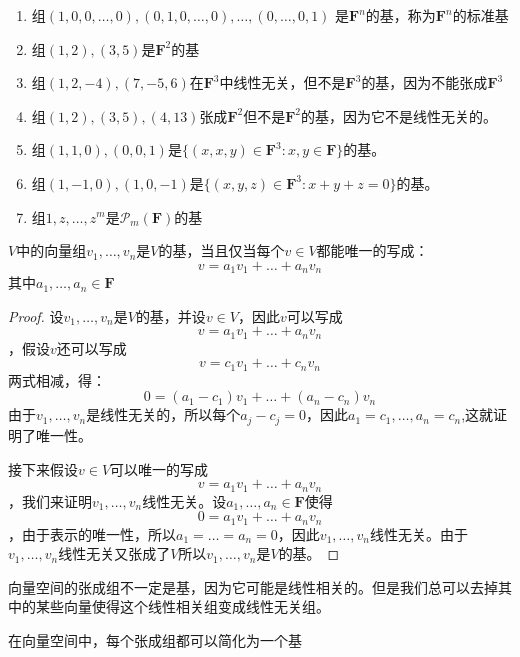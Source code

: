 \documentclass[10pt,a4paper,UTF8]{article}
\begin{document}
\begin{instance}
\begin{enumerate}
\item 组\((1,0,0,\ldots ,0),(0,1,0,\ldots ,0),\ldots ,(0,\ldots ,0,1)\) 是\(\mathbf{F}^{n}\)的基，称为\(\mathbf{F}^{n}\)的标准基
\item 组\((1,2),(3,5)\)是\(\mathbf{F}^{2}\)的基
\item 组\((1,2,-4),(7,-5,6)\)在\(\mathbf{F}^{3}\)中线性无关，但不是\(\mathbf{F}^{3}\)的基，因为不能张成\(\mathbf{F}^{3}\)
\item 组\((1,2),(3,5),(4,13)\)张成\(\mathbf{F}^{2}\)但不是\(\mathbf{F}^{2}\)的基，因为它不是线性无关的。
\item 组\((1,1,0),(0,0,1)\)是\(\{(x,x,y)\in \mathbf{F}^{3}:x,y\in \mathbf{F}\}\)的基。
\item 组\((1,-1,0),(1,0,-1)\)是\(\{(x,y,z)\in \mathbf{F}^{3}:x + y + z = 0\}\)的基。
\item 组\(1,z,\ldots ,z^{m}\)是\(\mathcal{P}_{m}(\mathbf{F})\)的基
\end{enumerate}
\end{instance}

\begin{theorem}[基的判定准则]
\(V\)中的向量组\(v_{1},\ldots ,v_{n}\)是\(V\)的基，当且仅当每个\(v\in V\)都能唯一的写成：\[v  = a_{1}v_{1} + \ldots + a_{n}v_{n}\]其中\(a_{1},\ldots ,a_{n}\in \mathbf{F}\)
\end{theorem}
\begin{proof}
设\(v_{1},\ldots ,v_{n}\)是\(V\)的基，并设\(v\in V\)，因此\(v\)可以写成\[v  = a_{1}v_{1} + \ldots + a_{n}v_{n}\]，假设\(v\)还可以写成\[v  = c_{1}v_{1} + \ldots + c_{n}v_{n}\]两式相减，得：
\[0  = (a_{1}- c_{1})v_{1} + \ldots + (a_{n}-c_{n})v_{n}\]由于\(v_{1},\ldots ,v_{n}\)是线性无关的，所以每个\(a_{j} - c_{j}=0\)，因此\(a_{1} = c_{1},\ldots ,a_{n} = c_{n}\),这就证明了唯一性。

接下来假设\(v\in V\)可以唯一的写成\[v  = a_{1}v_{1} + \ldots + a_{n}v_{n}\] ，我们来证明\(v_{1},\ldots ,v_{n}\)线性无关。设\(a_{1},\ldots ,a_{n}\in \mathbf{F}\)使得\[0  = a_{1}v_{1} + \ldots + a_{n}v_{n}\]，由于表示的唯一性，所以\(a_{1} = \ldots  = a_{n} = 0\)，因此\(v_{1},\ldots ,v_{n}\)线性无关。由于\(v_{1},\ldots ,v_{n}\)线性无关又张成了\(V\)所以\(v_{1},\ldots ,v_{n}\)是\(V\)的基。
\end{proof}

向量空间的张成组不一定是基，因为它可能是线性相关的。但是我们总可以去掉其中的某些向量使得这个线性相关组变成线性无关组。
\begin{theorem}[张成组包含基]
在向量空间中，每个张成组都可以简化为一个基
\end{theorem}
\end{document}
